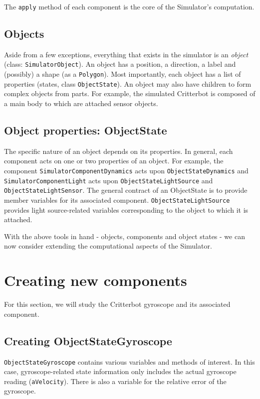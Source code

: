 \documentclass[12pt]{article}
\newcommand{\code}[1]{\texttt{#1}}
\newcommand{\keyword}[1]{\textit{#1}}
\begin{document}
\begin{itemize}
The \code{apply} method of each component is the core of the Simulator's
computation.

\subsection{Objects}

Aside from a few exceptions, everything that exists in the simulator is an
\keyword{object} (class: \code{SimulatorObject}). An object has a position,
a direction, a label and (possibly) a shape (as a \code{Polygon}). Most 
importantly, each object has a list of properties (states, class 
\code{ObjectState}). An object may also have children to form complex objects
from parts. For example, the simulated Critterbot is composed of a main body
to which are attached sensor objects.

\subsection{Object properties: ObjectState}

The specific nature of an object depends on its properties. In general, each
component acts on one or two properties of an object. For example, the 
component \code{SimulatorComponentDynamics} acts upon 
\code{ObjectStateDynamics} and \code{SimulatorComponentLight} acts upon
\code{ObjectStateLightSource} and \code{ObjectStateLightSensor}. The general
contract of an ObjectState is to provide member variables for its associated
component. \code{ObjectStateLightSource} provides light source-related 
variables corresponding to the object to which it is attached.


With the above tools in hand - objects, components and object states - we
can now consider extending the computational aspects of the Simulator.

\section{Creating new components}

For this section, we will study the Critterbot gyroscope and its associated
component.

\subsection{Creating ObjectStateGyroscope}

\code{ObjectStateGyroscope} contains various variables and methods of interest.
In this case, gyroscope-related state information only includes the actual 
gyroscope reading (\code{aVelocity}). There is also a variable for the 
relative error of the gyroscope.


\end{itemize}
\end{document}
